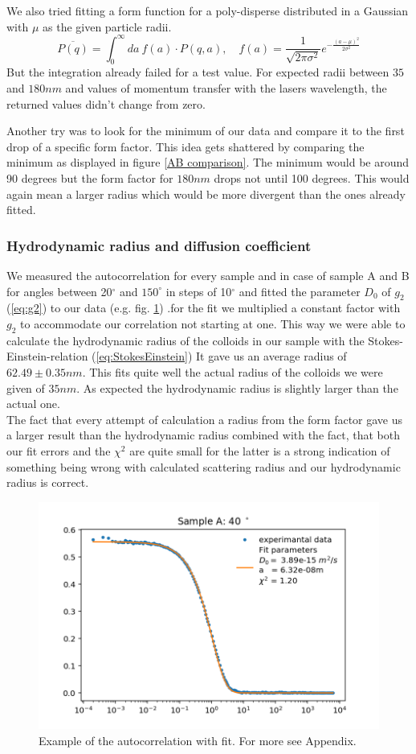 \documentclass[]{article}
\begin{document}
We also tried fitting a form function for a poly-disperse distributed in a Gaussian with $\mu$ as the given particle radii. 
\[ \overline{P(q)} = \int_0^\infty da\: f(a)\cdot P(q,a) , \quad f(a)= \frac{1}{\sqrt{2 \pi \sigma^2}} e^{-\frac{(a-\mu)^2}{2 \sigma^2}} \]
But the integration already failed for a test value. For expected radii between $35$ and $180nm$ and values of momentum transfer with the lasers wavelength, the returned values didn't change from zero.

Another try was to look for the minimum of our data and compare it to the first drop of a specific form factor. This idea gets shattered by comparing the minimum as displayed in figure \ref{AB comparison}. The minimum would be around 90 degrees but the form factor for $180nm$ drops not until 100 degrees. This would again mean a larger radius which would be more divergent than the ones already fitted.

\subsubsection{Hydrodynamic radius and diffusion coefficient}
We measured the autocorrelation for every sample and in case of sample A and B for angles between 20$^\circ$ and $150^\circ$ in steps of 10$^\circ$ and fitted the parameter $D_0$ of $g_2$ (\ref{eq:g2}) to our data (e.g. fig.  \ref{fig:Sample A 40}) .for the fit we multiplied a constant factor with $g_2$ to  accommodate our correlation not starting at one. This way we were able to calculate the hydrodynamic radius of the colloids in our sample with the Stokes-Einstein-relation (\ref{eq:StokesEinstein}) It gave us an average radius of $62.49 \pm  0.35nm$. This fits quite well the actual radius of the colloids we were given of $35nm$. As expected the  hydrodynamic radius is slightly larger than the actual one. \\ The fact that every attempt of calculation a radius from the form factor gave us a larger result than the hydrodynamic radius combined with the fact, that both our fit errors and the $\chi^2$ are quite small for the latter is a strong indication of something being wrong with calculated scattering radius and our hydrodynamic radius is correct.  


\begin{figure}[!htbp]
	\centering
	\includegraphics[width=0.7\linewidth]{Plots/A/40}
	\caption{Example of the autocorrelation with fit. For more see Appendix.}
	\label{fig:Sample A 40}
\end{figure}
\end{document}
